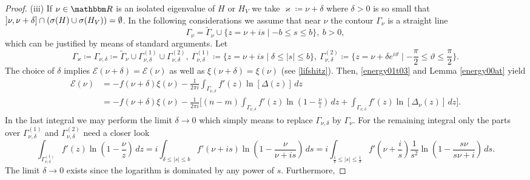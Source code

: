\begin{proof}
(iii)
If $\nu\in\R$ is an isolated eigenvalue of $H$ or $H_V$ we take $\varkappa\coloneqq\nu+\delta$
where $\delta>0$ is so small that $\interval[open left]{\nu}{\nu+\delta}\cap(\sigma(H)\cup\sigma(H_V))=\emptyset$.
In the following considerations we assume that near $\nu$ the contour $\Gamma_\nu$ is a straight line 
\begin{equation*}
   \Gamma_\nu = \tilde\Gamma_\nu \cup \{ z=\nu+is \mid -b\leq s\leq b\},\ b>0,
\end{equation*}
which can be justified by means of standard arguments. Let
\begin{equation*}
  \Gamma_\varkappa \coloneqq \Gamma_{\nu,\delta} 
                 \coloneqq \tilde\Gamma_\nu \cup \Gamma_{\nu,\delta}^{(1)} \cup \Gamma_{\nu,\delta}^{(2)},\
    \Gamma_{\nu,\delta}^{(1)}\coloneqq \{ z = \nu+is \mid \delta \leq |s| \leq b\} ,\ 
    \Gamma_{\nu,\delta}^{(2)}\coloneqq \{ z = \nu+\delta e^{i\vartheta} \mid -\frac{\pi}{2} \leq \vartheta \leq \frac{\pi}{2}\} .
\end{equation*}
The choice of $\delta$ implies $\mathcal{E}(\nu+\delta)=\mathcal{E}(\nu)$ as well as $\xi(\nu+\delta)=\xi(\nu)$ (see \eqref{lifshitz}).
Then, \eqref{energy01t03} and Lemma \ref{energy00at} yield
\begin{equation}\label{energy01t04}
\begin{split}
  \mathcal{E}(\nu) 
    & = -f(\nu+\delta)\xi(\nu) - \frac{1}{2\pi i} \int_{\Gamma_{\nu,\delta}} f'(z)\ln[\Delta(z)]\, dz\\
    & = -f(\nu+\delta)\xi(\nu)
           - \frac{1}{2\pi i}\Big[(n-m)\int_{\Gamma_{\nu,\delta}} f'(z) \ln(1-\frac{\nu}{z})\, dz 
                                    + \int_{\Gamma_{\nu,\delta}} f'(z) \ln[\Delta_\nu(z)]\, dz\Big] .
\end{split}
\end{equation}
In the last integral we may perform the limit $\delta\to 0$ which simply means to replace $\Gamma_{\nu,\delta}$ by $\Gamma_\nu$.
For the remaining integral only the parts over $\Gamma_{\nu,\delta}^{(1)}$ and $\Gamma_{\nu,\delta}^{(2)}$ need a closer look
\begin{equation*}
  \int_{\Gamma_{\nu,\delta}^{(1)}} f'(z) \ln(1- \frac{\nu}{z})\, dz
     = i \int_{\delta\leq |s|\leq b} f'(\nu+is) \ln(1-\frac{\nu}{\nu+is})\, ds
     = i \int_{\frac{1}{b}\leq |s|\leq \frac{1}{\delta}} f'(\nu+\frac{i}{s}) \frac{1}{s^2}\ln(1-\frac{s\nu}{{s\nu+i}})\, ds .
\end{equation*}
The limit $\delta\to 0$ exists since the logarithm is dominated by any power of $s$. Furthermore,

\end{proof}
